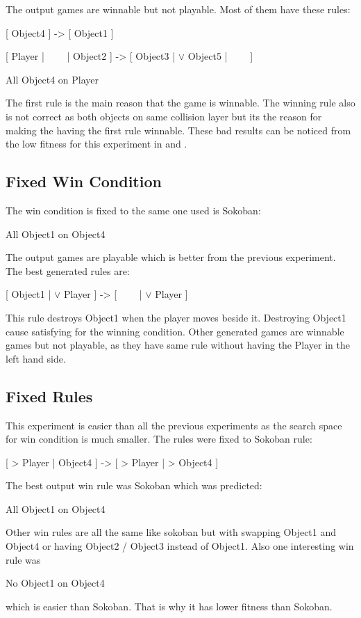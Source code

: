 
The output games are winnable but not playable. Most of them have these rules:
\begin{center}
[ Object4 ] -> [ Object1 ]
\end{center}
\begin{center}
[ Player | \ \ \ \ |  Object2 ] -> [  Object3 | $\vee$ Object5 | \ \ \ \ ]
\end{center}
\begin{center}
All Object4 on Player
\end{center}
The first rule is the main reason that the game is winnable. The winning rule also is not correct as both objects on same collision layer but its the reason for making the having the first rule winnable. These bad results can be noticed from the low fitness for this experiment in  and .

\subsection{Fixed Win Condition}
The win condition is fixed to the same one used is Sokoban:
\begin{center}
All Object1 on Object4
\end{center}

The output games are playable which is better from the previous experiment. The best generated rules are:
\begin{center}
[  Object1 | $\vee$ Player ] -> [ \ \ \ \ | $\vee$ Player ]
\end{center}
This rule destroys Object1 when the player moves beside it. Destroying Object1 cause satisfying for the winning condition. Other generated games are winnable games but not playable, as they have same rule without having the Player in the left hand side.

\subsection{Fixed Rules}
This experiment is easier than all the previous experiments as the search space for win condition is much smaller. The rules were fixed to Sokoban rule:
\begin{center}
[ > Player | Object4 ] -> [ > Player | > Object4 ]
\end{center}

The best output win rule was Sokoban which was predicted:
\begin{center}
All Object1 on Object4
\end{center}
Other win rules are all the same like sokoban but with swapping Object1 and Object4 or having Object2 / Object3 instead of Object1. Also one interesting win rule was 
\begin{center}
No Object1 on Object4
\end{center}
which is easier than Sokoban. That is why it has lower fitness than Sokoban.